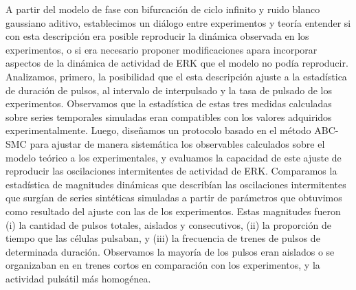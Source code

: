 \documentclass[./main.tex]{subfiles}
\begin{document}
A partir del modelo de fase con bifurcación de ciclo infinito y ruido blanco gaussiano aditivo, establecimos un diálogo entre experimentos y teoría entender si con esta descripción era posible reproducir la dinámica observada en los experimentos, o si era necesario proponer modificaciones apara incorporar aspectos de la dinámica de actividad de ERK que el modelo no podía reproducir. Analizamos, primero, la posibilidad que el esta descripción ajuste a la estadística de duración de pulsos, al intervalo de interpulsado y la tasa de pulsado de los experimentos. Observamos que la estadística de estas tres medidas calculadas sobre series temporales simuladas eran compatibles con los valores adquiridos experimentalmente. Luego, diseñamos un protocolo basado en el método ABC-SMC para ajustar de manera sistemática los observables calculados sobre el modelo teórico a los experimentales, y evaluamos la capacidad de este ajuste de reproducir las oscilaciones intermitentes de actividad de ERK. Comparamos la estadística de magnitudes dinámicas que describían las oscilaciones intermitentes que surgían de series sintéticas simuladas a partir de parámetros que obtuvimos como resultado del ajuste con las de los experimentos. Estas magnitudes fueron (i) la cantidad de pulsos totales, aislados y consecutivos, (ii) la proporción de tiempo que las células pulsaban, y (iii) la frecuencia de trenes de pulsos de determinada duración. Observamos la mayoría de los pulsos eran aislados o se organizaban en en trenes cortos en comparación con los experimentos, y la actividad pulsátil más homogénea. 
\end{document}
